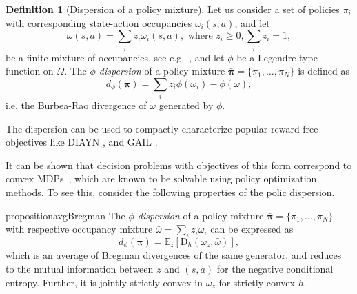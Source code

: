 \documentclass{article}
\theoremstyle{plain}
\theoremstyle{definition}
\newtheorem{definition}[theorem]{Definition}
\theoremstyle{remark}
\newcommand{\p}{\omega}  %
\begin{document}
\begin{definition}[Dispersion of a policy mixture]
    Let us consider a set of policies $\pi_i$ with corresponding state-action occupancies $\omega_i(s,a)$, and let 
\begin{equation}
    \omega(s,a) = \sum_{i} z_i \omega_i(s,a), \text{ where } z_i \geq 0, \sum_{i} z_i = 1,
\end{equation}
be a finite mixture of occupancies, see e.g.~\citep{peng2019advantageweightedregressionsimplescalable, laroche23occupancy}, and let $\phi$ be a Legendre-type function on $\Omega$. 
The \emph{$\phi$-dispersion} of a policy mixture $\bar{\boldsymbol{\pi}} = \{\pi_1, \dots, \pi_N\}$ is defined as
\begin{equation}
    d_\phi(\bar{\boldsymbol{\pi}}) = \sum_i z_i \phi(\omega_i) - \phi(\omega),
\end{equation}
i.e. the Burbea-Rao divergence of $\omega$ generated by $\phi$.
\end{definition}

The dispersion can be used to compactly characterize popular reward-free objectives like DIAYN \citep{gregor2016variational, eysenbach2018diversity}, and GAIL \citep{ho2016generative}. 

It can be shown that decision problems with objectives of this form correspond to convex MDPs~\citep{zahavy2021reward}, which are known to be solvable using policy optimization methods. To see this, consider the following properties of the polic dispersion.
\begin{restatable}{proposition}{avgBregman}
    The \emph{$\phi$-dispersion} of a policy mixture $\bar{\boldsymbol{\pi}} = \{\pi_1, \dots, \pi_N\}$ with respective occupancy mixture $\bar{\omega} = \sum_i z_i \omega_i$ can be expressed as
    \begin{equation}\label{eq:bregman-jensen}
        d_\phi(\boldsymbol{\bar\pi}) = \mathbb{E}_z[\mathrm{D}_h(\omega_z,\bar\omega)],
    \end{equation}
    which is an average of Bregman divergences of the same generator, and reduces to the mutual information between $z$ and $(s,a)$ for the negative conditional entropy. 
    Further, it is jointly strictly convex in $\omega_z$ for strictly convex $h$.
\end{restatable}
\end{document}
